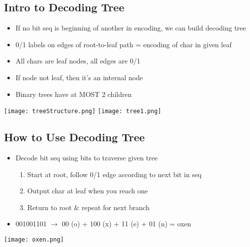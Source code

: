 \documentclass{article}
\begin{document}
\subsection{Intro to Decoding Tree}
    \begin{multicols}{2}
        \begin{itemize}
            \item If no bit seq is beginning of another in encoding, we can build decoding tree
            \item 0/1 labels on edges of root-to-leaf path = encoding of char in given leaf
            \item All chars are leaf nodes, all edges are 0/1
            \item If node not leaf, then it's an internal node
            \item Binary trees have at MOST 2 children
        \end{itemize}
    \end{multicols}

    \begin{center}
        \begin{multicols}{2}
            \texttt{[image: treeStructure.png]}
            \texttt{[image: tree1.png]}
        \end{multicols}
    \end{center}
\vspace{-2em}

\subsection{How to Use Decoding Tree}
    \begin{multicols}{2}
        \begin{itemize}
            \item Decode bit seq using bits to traverse given tree
                \begin{enumerate}
                    \item Start at root, follow 0/1 edge according to next bit in seq
                    \item Output char at leaf when you reach one
                    \item Return to root \& repeat for next branch
                \end{enumerate}
            \item 001001101 $\rightarrow$ 00 (o) + 100 (x) + 11 (e) + 01 (n) = oxen
        \end{itemize}
        \vfill \hspace{5em} \texttt{[image: oxen.png]}
    \end{multicols}
\end{document}
